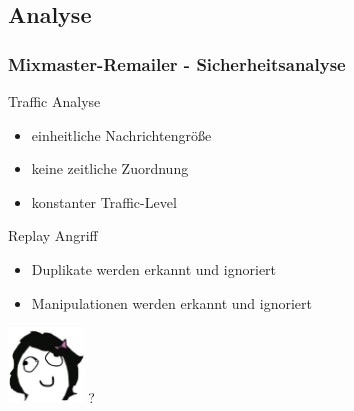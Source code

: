 \documentclass{beamer}
\begin{document}
\subsection{Analyse}
\begin{frame}
	\frametitle{Mixmaster-Remailer - Sicherheitsanalyse}
	\begin{exampleblock}{Traffic Analyse}
		\begin{itemize}
			\item einheitliche Nachrichtengröße
			\item keine zeitliche Zuordnung
			\item konstanter Traffic-Level
		\end{itemize}
	\end{exampleblock}

	\begin{exampleblock}{Replay Angriff}
		\begin{itemize}
			\item Duplikate werden erkannt und ignoriert
			\item Manipulationen werden erkannt und ignoriert
		\end{itemize}
	\end{exampleblock}

	\centering
	\includegraphics[height=2cm]{bilder/alice.jpg} ?
\end{frame}
\end{document}
